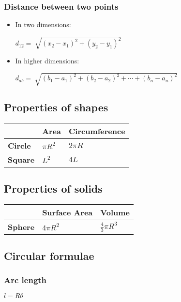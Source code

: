 \subsubsection{Distance between two points}
\begin{itemize}
\item In two dimensions:
\begin{itemize}
    \itemt \( d_{12} = \sqrt[]{(x_2-x_1)^2 + (y_2-y_1)^2} \)
\end{itemize}
\item In higher dimensions:
\begin{itemize}
    \itemt \( d_{ab} = \sqrt[]{(b_1-a_1)^2 + (b_2-a_2)^2 + \cdots + (b_n - a_n)^2} \)
\end{itemize}
\end{itemize}
            


\def\arraystretch{1.5}

		\subsection{Properties of shapes}
\begin{tabular}{|l|l|l|}
\hline
				& \textbf{Area} 		& \textbf{Circumference}
\\ \hline 
\textbf{Circle}	& \( \pi R^2 \)			& \( 2 \pi R \)
\\ \hline
\textbf{Square} & \( L^2	\)			& \( 4L \)
\\ \hline
\end{tabular}

		\subsection{Properties of solids}
\begin{tabular}{|l|l|l|}
\hline
				& \textbf{Surface Area} & \textbf{Volume}
\\ \hline 
\textbf{Sphere}	& \( 4\pi R^2 \)		& \( \frac{4}{3} \pi R^3 \)
\\ \hline
\end{tabular}

		\subsection{Circular formulae}

\subsubsection{Arc length}
\begin{itemize}
\itemt \( l = R\theta \)
\end{itemize}

